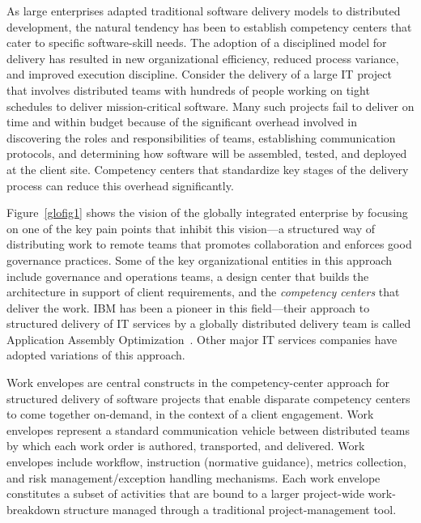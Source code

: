 As large enterprises adapted traditional software delivery models to distributed
development, the natural tendency has been to establish competency centers that
cater to specific software-skill needs. The adoption of a disciplined model for
delivery has resulted in new organizational efficiency, reduced process
variance, and improved execution discipline. Consider the delivery of a large IT
project that involves distributed teams with hundreds of people working on tight
schedules to deliver mission-critical software. Many such projects fail to
deliver on time and within budget because of the significant overhead involved
in discovering the roles and responsibilities of teams, establishing
communication protocols, and determining how software will be assembled, tested,
and deployed at the client site. Competency centers that standardize key stages
of the delivery process
can reduce this overhead significantly.

Figure~\ref{glofig1} shows the vision of the globally integrated enterprise by
focusing on one of the key pain points that inhibit this vision---a structured
way of distributing work to remote teams that promotes collaboration and
enforces good governance practices.  Some of the key organizational entities in
this approach include governance and operations teams, a design center that
builds the architecture in support of client requirements, and the
\textit{competency centers} that deliver the work. IBM has been a pioneer in
this field---their approach to structured delivery of IT services by a globally
distributed delivery team is called Application Assembly
Optimization~\cite{gloaao}. Other major IT services companies have adopted
variations of this approach.

Work envelopes are central constructs in the competency-center approach for
structured delivery of software projects that enable disparate competency
centers to come together on-demand, in the context of a client engagement.  Work
envelopes represent a standard communication vehicle between distributed teams
by which each work order is authored, transported, and delivered. Work envelopes
include workflow, instruction (normative guidance), metrics collection, and risk
management/exception handling mechanisms. Each work envelope constitutes a
subset of activities that are bound to a larger project-wide work-breakdown
structure managed through a traditional project-management tool.

